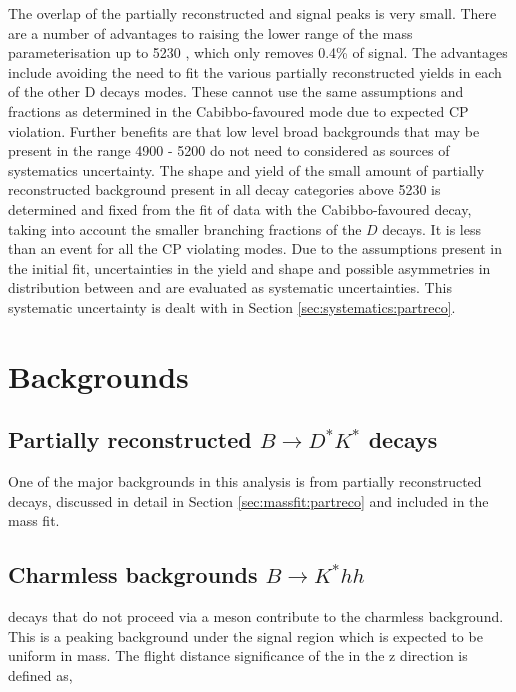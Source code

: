 The overlap of the partially reconstructed and signal peaks is very small. There are a number of advantages to raising the lower range of the mass parameterisation up to 5230 \mev, which only removes 0.4\% of signal. The advantages include avoiding the need to fit the various partially reconstructed yields in each of the other D decays modes. These cannot use the same assumptions and fractions as determined in the Cabibbo-favoured mode due to expected CP violation. Further benefits are that low level broad backgrounds that may be present in the range 4900 - 5200 \mev do not need to considered as sources of systematics uncertainty. The shape and yield of the small amount of partially reconstructed background present in all \D decay categories above 5230 \mev is determined and fixed from the fit of data with the Cabibbo-favoured decay, taking into account the smaller branching fractions of the $D$ decays. It is less than an event for all the CP violating modes. Due to the assumptions present in the initial fit, uncertainties in the yield and shape and possible asymmetries in distribution between \Bp and \Bm are evaluated as systematic uncertainties. This systematic uncertainty is dealt with in Section \ref{sec:systematics:partreco}.


\clearpage

\section{Backgrounds}
\label{sec:backgrounds}

\subsection{Partially reconstructed $B \to D^*K^*$ decays}
\label{sec:backgrounds:partreco}

One of the major backgrounds in this analysis is from partially reconstructed \decay{\B}{\Dstar\Kstar} decays, discussed in detail in Section \ref{sec:massfit:partreco} and included in the mass fit.

\subsection{Charmless backgrounds $B \to K^*hh$}
\label{sec:backgrounds:charmless}

\B decays that do not proceed via a \D meson contribute to the charmless background. This is a peaking background under the signal region which is expected to be uniform in \D mass. The flight distance significance of the \Dz in the z direction is defined as,

